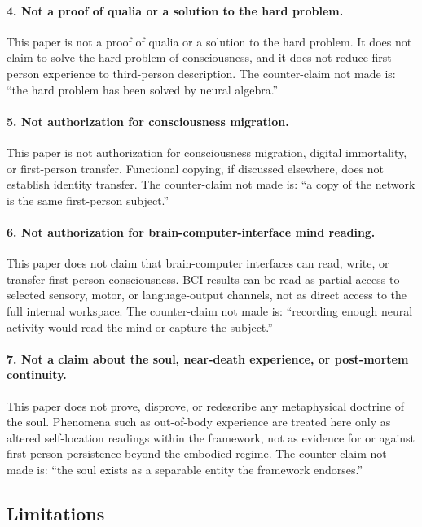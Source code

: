 \documentclass[12pt]{article}
\theoremstyle{definition}
\theoremstyle{remark}
\begin{document}
\paragraph{4. Not a proof of qualia or a solution to the hard problem.}
This paper is not a proof of qualia or a solution to the hard problem.
It does not claim to solve the hard problem of consciousness, and it
does not reduce first-person experience to third-person description. The
counter-claim not made is: ``the hard problem has been solved by neural
algebra.''

\paragraph{5. Not authorization for consciousness migration.}
This paper is not authorization for consciousness migration, digital
immortality, or first-person transfer. Functional copying, if discussed
elsewhere, does not establish identity transfer. The counter-claim not
made is: ``a copy of the network is the same first-person subject.''

\paragraph{6. Not authorization for brain-computer-interface mind reading.}
This paper does not claim that brain-computer interfaces can read,
write, or transfer first-person consciousness. BCI results can be read
as partial access to selected sensory, motor, or language-output
channels, not as direct access to the full internal workspace. The
counter-claim not made is: ``recording enough neural activity would
read the mind or capture the subject.''

\paragraph{7. Not a claim about the soul, near-death experience, or post-mortem continuity.}
This paper does not prove, disprove, or redescribe any metaphysical
doctrine of the soul. Phenomena such as out-of-body experience are
treated here only as altered self-location readings within the
framework, not as evidence for or against first-person persistence
beyond the embodied regime. The counter-claim not made is: ``the soul
exists as a separable entity the framework endorses.''

\subsection{Limitations}
\end{document}
